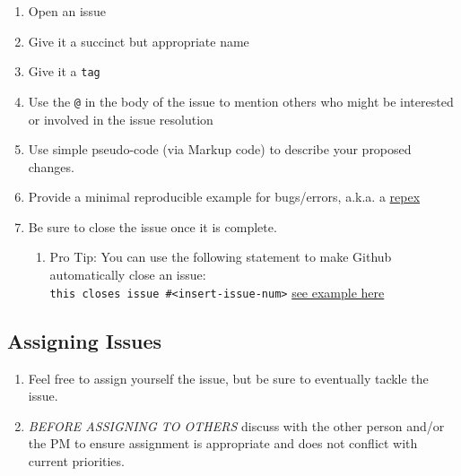 \documentclass[
  letterpaper,
  DIV=11,
  numbers=noendperiod]{scrreprt}
\providecommand{\tightlist}{%
  \setlength{\itemsep}{0pt}\setlength{\parskip}{0pt}}\usepackage{longtable,booktabs,array}
\begin{document}
\begin{enumerate}
\def\labelenumi{\arabic{enumi}.}
\tightlist
\item
  Open an issue\\
\item
  Give it a succinct but appropriate name\\
\item
  Give it a \texttt{tag}\\
\item
  Use the \texttt{@} in the body of the issue to mention others who
  might be interested or involved in the issue resolution\\
\item
  Use simple pseudo-code (via Markup code) to describe your proposed
  changes.\\
\item
  Provide a minimal reproducible example for bugs/errors, a.k.a. a
  \href{https://stackoverflow.com/help/minimal-reproducible-example}{repex}\\
\item
  Be sure to close the issue once it is complete.

  \begin{enumerate}
  \def\labelenumii{\alph{enumii}.}
  \tightlist
  \item
    Pro Tip: You can use the following statement to make Github
    automatically close an issue:\\
    \texttt{this\ closes\ issue\ \#\textless{}insert-issue-num\textgreater{}}
    \href{https://github.com/jjannot-NOAA/PlantSamplingAnalysis/issues/5\#issuecomment-1480164759}{see
    example here}
  \end{enumerate}
\end{enumerate}

\subsection{Assigning Issues}\label{assigning-issues}

\begin{enumerate}
\def\labelenumi{\arabic{enumi}.}
\tightlist
\item
  Feel free to assign yourself the issue, but be sure to eventually
  tackle the issue.
\item
  \emph{BEFORE ASSIGNING TO OTHERS} discuss with the other person and/or
  the PM to ensure assignment is appropriate and does not conflict with
  current priorities.
\end{enumerate}
\end{document}
